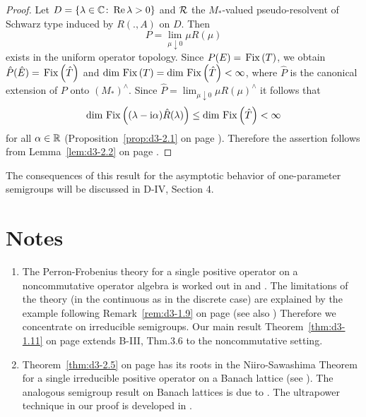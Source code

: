 \begin{proof}
Let $D = \{\lambda \in \mathbb{C} \colon \mathop{}\!\mathrm{Re}\,\lambda > 0\}$ and $\mathcal{R}$ the $M_{*}$-valued pseudo-resolvent of Schwarz type induced by $R(.,A)$ on $D$.
Then
\[
	P = \lim_{\mu \downarrow 0}\mu R(\mu)
\]
exists in the uniform operator topology.
Since $ P(E) = \mathop{}\mathrm{Fix}\left(T\right) $, we obtain $ \hat{P}(\hat{E}) = \mathop{}\mathrm{Fix}\left(\hat{T}\right) $ and 
$\dim \mathop{}\mathrm{Fix}\left(T\right) = \dim \mathop{}\mathrm{Fix}\left(\hat{T}\right) < \infty$, where $\hat{P}$ is the canonical extension of $P$ onto $(M_{*})^{\wedge}$.
Since $\hat{P} = \lim_{\mu \downarrow 0} \mu R(\mu)^{\wedge}$ it follows that
\[
\dim \mathop{}\mathrm{Fix}\left((\lambda - \mathrm{i}\alpha)\hat{R}(\lambda)\right) \leq \dim \mathop{}\mathrm{Fix}\left(\hat{T}\right) < \infty
\]
for all $\alpha \in \mathbb{R}$ (Proposition~\ref{prop:d3-2.1} on page \pageref{prop:d3-2.1}).
Therefore the assertion follows from Lemma~\ref{lem:d3-2.2} on page \pageref{lem:d3-2.2}.
\end{proof} 
The consequences of this result for the asymptotic behavior of one-parameter semigroups will be discussed in D-IV, Section 4.
\section*{Notes}\label{notes:d3-notes}

\begin{enumerate}[label=\emph{Section \arabic*:}, wide, itemsep=1ex]

\item
The Perron-Frobenius theory for a single positive operator on a noncommutative operator algebra is worked out in \citet{albeverio:1978} and \citet{groh:1981}.
The limitations of the theory (in the continuous as in the discrete case)
are explained by the example following Remark~\ref{rem:d3-1.9} on page \pageref{rem:d3-1.9} (see also \citet{groh:1982a}) 
Therefore we concentrate on irreducible semigroups.
Our main result Theorem~\ref{thm:d3-1.11} on page \pageref{thm:d3-1.11} extends B-III, Thm.3.6 to the noncommutative setting.

\item
Theorem~\ref{thm:d3-2.5} on page \pageref{thm:d3-2.5} has its roots in the Niiro-Sawashima Theorem for a single irreducible positive operator on a Banach lattice (see \citet[V.5.4]{schaefer:1974}).
The analogous semigroup result on Banach lattices is due to \citet{greiner:1982}.
The ultrapower technique in our proof is developed in \citet{groh:1984b}. 

\end{enumerate}


